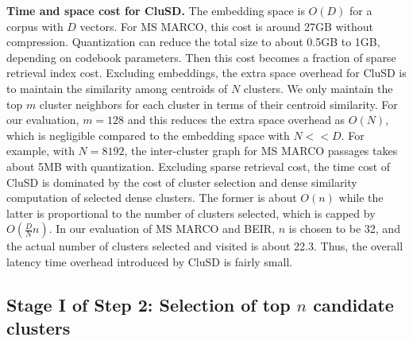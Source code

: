 
{\bf Time  and space  cost for CluSD.} 
The embedding space is $O(D)$  for a corpus with $D$ vectors.
For MS MARCO, this  cost is around 27GB without compression. Quantization can reduce the total size to about  0.5GB  to 1GB, depending on codebook parameters.
Then this cost becomes a fraction of sparse retrieval index cost.  
Excluding embeddings, the extra space overhead for CluSD is to maintain  the similarity among centroids of $N$ clusters.
We only maintain the top $m$ cluster neighbors for each cluster in terms of their centroid similarity. 
For our evaluation, $m=128$ and this reduces the extra space overhead as $O(N)$, which
is negligible compared  to the embedding space with $N << D$. 
For example,  with $N=8192$,  the inter-cluster graph for MS MARCO passages takes about 5MB with quantization.
Excluding sparse retrieval cost, the time  cost of 
CluSD is dominated by the cost of cluster selection and  dense similarity computation of selected dense clusters.
The former is about $O(n)$ while the latter is
proportional to the number of clusters selected, which is capped by $O(\frac{D}{N} n)$. 
In  our evaluation of MS MARCO and BEIR, $n$ is chosen to be 32, and
the actual number of clusters selected and visited is about 22.3.
Thus, the overall latency time overhead introduced by CluSD is fairly small. 


\subsection{ Stage I of Step 2: Selection of  top $n$ candidate clusters} 
\label{sect:stage1}

